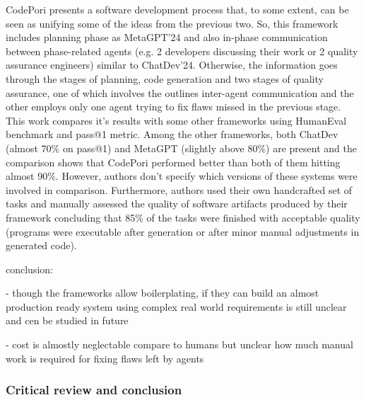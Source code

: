 CodePori \cite{rasheed2024codeporilargescaleautonomoussoftware} presents a software development process that, to some extent, can be seen as unifying some of the ideas from the previous two. So, this framework includes planning phase as MetaGPT'24 and also in-phase communication between phase-related agents (e.g. 2 developers discussing their work or 2 quality assurance engineers) similar to ChatDev'24. Otherwise, the information goes through the stages of planning, code generation and two stages of quality assurance, one of which involves the outlines inter-agent communication and the other employs only one agent trying to fix flaws missed in the previous stage. This work compares it's results with some other frameworks using HumanEval \cite{humaneval} benchmark and pass@1 metric. Among the other frameworks, both ChatDev (almost 70\% on pass@1) and MetaGPT (slightly above 80\%) are present and the comparison shows that CodePori performed better than both of them hitting almost 90\%. However, authors don't specify which versions of these systems were involved in comparison. Furthermore, authors used their own handcrafted set of tasks and manually assessed the quality of software artifacts produced by their framework concluding that 85\% of the tasks were finished with acceptable quality (programs were executable after generation or after minor manual adjustments in generated code). 




conclusion:

- though the frameworks allow boilerplating, if they can build an almost production ready system using complex real world requirements is still unclear and cen be studied in future

- cost is almostly neglectable compare to humans but unclear how much manual work is required for fixing flaws left by agents


\subsubsection{Critical review and conclusion}
\label{mas:conclusion}
